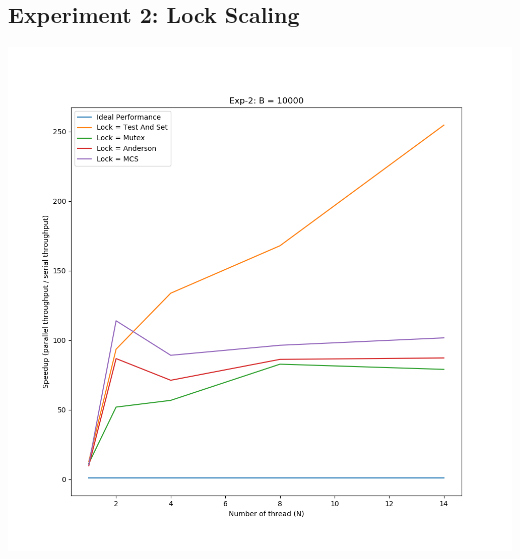 \documentclass[]{article}
\begin{document}
\subsection{Experiment 2: Lock Scaling}
\includegraphics[scale=0.5]{graphs/exp2.png}\\
\end{document}
